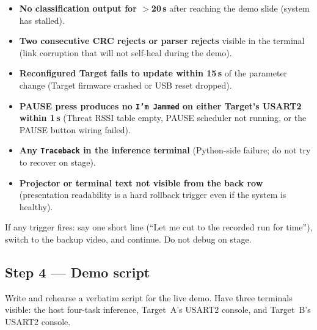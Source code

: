 \documentclass[11pt,letterpaper]{article}
\begin{document}
\begin{tcolorbox}[warning={Rollback Trigger Criteria --- Switch to Backup Video If}]
	\begin{itemize}[leftmargin=1.2em]
		\item \textbf{No classification output for $>$20\,s} after reaching the demo slide (system has stalled).
		\item \textbf{Two consecutive \mbox{CRC} rejects or parser rejects} visible in the terminal (link corruption that will not self-heal during the demo).
		\item \textbf{Reconfigured Target fails to update within 15\,s} of the parameter change (Target firmware crashed or USB reset dropped).
		\item \textbf{PAUSE press produces no \texttt{I'm Jammed} on either Target's USART2 within 1\,s} (Threat RSSI table empty, PAUSE scheduler not running, or the PAUSE button wiring failed).
		\item \textbf{Any \texttt{Traceback} in the inference terminal} (Python-side failure; do not try to recover on stage).
		\item \textbf{Projector or terminal text not visible from the back row} (presentation readability is a hard rollback trigger even if the system is healthy).
	\end{itemize}
	If any trigger fires: say one short line (``Let me cut to the recorded run for time''), switch to the backup video, and continue. Do not debug on stage.
\end{tcolorbox}

\subsection{Step 4 --- Demo script}
Write and rehearse a verbatim script for the live demo. Have three terminals visible: the host four-task inference, Target~A's USART2 console, and Target~B's USART2 console.
\end{document}
